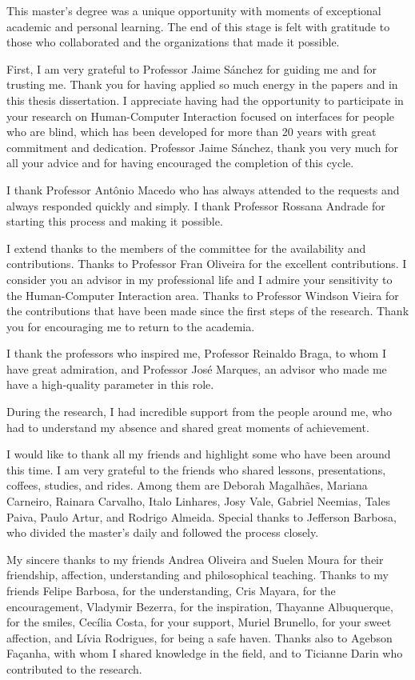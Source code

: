 This master's degree was a unique opportunity with moments of exceptional academic and personal learning. The end of this stage is felt with gratitude to those who collaborated and the organizations that made it possible.

First, I am very grateful to Professor Jaime Sánchez for guiding me and for trusting me. Thank you for having applied so much energy in the papers and in this thesis dissertation. I appreciate having had the opportunity to participate in your research on Human-Computer Interaction focused on interfaces for people who are blind, which has been developed for more than 20 years with great commitment and dedication. Professor Jaime Sánchez, thank you very much for all your advice and for having encouraged the completion of this cycle.

I thank Professor Antônio Macedo who has always attended to the requests and always responded quickly and simply. I thank Professor Rossana Andrade for starting this process and making it possible.

I extend thanks to the members of the committee for the availability and contributions. Thanks to Professor Fran Oliveira for the excellent contributions. I consider you an advisor in my professional life and I admire your sensitivity to the Human-Computer Interaction area. Thanks to Professor Windson Vieira for the contributions that have been made since the first steps of the research. Thank you for encouraging me to return to the academia.

I thank the professors who inspired me, Professor Reinaldo Braga, to whom I have great admiration, and Professor José Marques, an advisor who made me have a high-quality parameter in this role.

During the research, I had incredible support from the people around me, who had to understand my absence and shared great moments of achievement.

I would like to thank all my friends and highlight some who have been around this time. I am very grateful to the friends who shared lessons, presentations, coffees, studies, and rides. Among them are Deborah Magalhães, Mariana Carneiro, Rainara Carvalho, Italo Linhares, Josy Vale, Gabriel Neemias, Tales Paiva, Paulo Artur, and Rodrigo Almeida. Special thanks to Jefferson Barbosa, who divided the master's daily and followed the process closely.

My sincere thanks to my friends Andrea Oliveira and Suelen Moura for their friendship, affection, understanding and philosophical teaching. Thanks to my friends Felipe Barbosa, for the understanding, Cris Mayara, for the encouragement, Vladymir Bezerra, for the inspiration, Thayanne Albuquerque, for the smiles, Cecília Costa, for your support, Muriel Brunello, for your sweet affection, and Lívia Rodrigues, for being a safe haven. Thanks also to Agebson Façanha, with whom I shared knowledge in the field, and to Ticianne Darin who contributed to the research.

